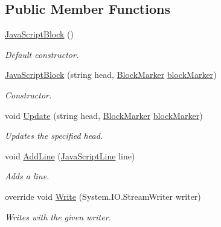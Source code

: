 \subsection*{Public Member Functions}
\begin{DoxyCompactItemize}
\item 
\hyperlink{class_a_rdev_kit_1_1_model_1_1_project_1_1_file_1_1_java_script_block_a18fb115fee2f2c0306ed9c8ac094f402}{Java\-Script\-Block} ()
\begin{DoxyCompactList}\small\item\em Default constructor. \end{DoxyCompactList}\item 
\hyperlink{class_a_rdev_kit_1_1_model_1_1_project_1_1_file_1_1_java_script_block_a919e16cc030b89f0cbc43e5631cd5704}{Java\-Script\-Block} (string head, \hyperlink{class_a_rdev_kit_1_1_model_1_1_project_1_1_file_1_1_block_marker}{Block\-Marker} \hyperlink{class_a_rdev_kit_1_1_model_1_1_project_1_1_file_1_1_abstract_block_a0975ceb65947c7370dcb6565677e9d0e}{block\-Marker})
\begin{DoxyCompactList}\small\item\em Constructor. \end{DoxyCompactList}\item 
void \hyperlink{class_a_rdev_kit_1_1_model_1_1_project_1_1_file_1_1_java_script_block_ab4b6c393041f5000aa7756966e9fdbac}{Update} (string head, \hyperlink{class_a_rdev_kit_1_1_model_1_1_project_1_1_file_1_1_block_marker}{Block\-Marker} \hyperlink{class_a_rdev_kit_1_1_model_1_1_project_1_1_file_1_1_abstract_block_a0975ceb65947c7370dcb6565677e9d0e}{block\-Marker})
\begin{DoxyCompactList}\small\item\em Updates the specified head. \end{DoxyCompactList}\item 
void \hyperlink{class_a_rdev_kit_1_1_model_1_1_project_1_1_file_1_1_java_script_block_a1cbaad8763bacb2f87a5cd8b9d075955}{Add\-Line} (\hyperlink{class_a_rdev_kit_1_1_model_1_1_project_1_1_file_1_1_java_script_line}{Java\-Script\-Line} line)
\begin{DoxyCompactList}\small\item\em Adds a line. \end{DoxyCompactList}\item 
override void \hyperlink{class_a_rdev_kit_1_1_model_1_1_project_1_1_file_1_1_java_script_block_afe7251c8168c8d6062c7054bf0c21bf1}{Write} (System.\-I\-O.\-Stream\-Writer writer)
\begin{DoxyCompactList}\small\item\em Writes with the given writer. \end{DoxyCompactList}\end{DoxyCompactItemize}
